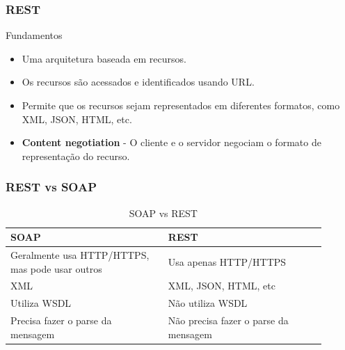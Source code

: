 \documentclass[
	10pt, %
	t, %
]{beamer}
\begin{document}
\begin{frame}
	\frametitle{REST}
	
	\begin{exampleblock}{Fundamentos}
		\begin{itemize}
			\item Uma arquitetura baseada em recursos.
			\item Os recursos são acessados e identificados usando URL.
			\item Permite que os recursos sejam representados em diferentes formatos, como XML, JSON, HTML, etc.
			\item \textbf{Content negotiation} - O cliente e o servidor negociam o formato de representação do recurso.
		\end{itemize}
	\end{exampleblock}

\end{frame}

\begin{frame}
	\frametitle{REST vs SOAP}
	
	\begin{table}
		\renewcommand{\arraystretch}{1.5} %
		\begin{tabular}{|p{0.45\linewidth}|p{0.45\linewidth}|}
			\hline
			\textbf{SOAP} & \textbf{REST} \\ \hline
			Geralmente usa HTTP/HTTPS, mas pode usar outros & Usa apenas HTTP/HTTPS \\ \hline
			XML & XML, JSON, HTML, etc \\ \hline
			Utiliza WSDL & Não utiliza WSDL \\ \hline
			Precisa fazer o parse da mensagem & Não precisa fazer o parse da mensagem \\ \hline
		\end{tabular}
		\caption{SOAP vs REST}
		\label{tab:soap_rest}

	\end{table}

\end{frame}
\end{document}

